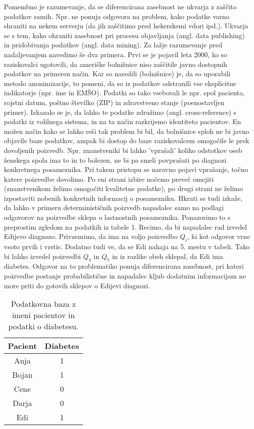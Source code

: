 \documentclass[12pt,a4paper]{amsart}
\theoremstyle{definition} %
\theoremstyle{plain} %
\begin{document}
Pomembno je razumevanje, da se diferencirana zasebnost ne ukvarja z zaščito podatkov samih. Npr. ne ponuja odgovora na problem, kako podatke varno shraniti na nekem serverju (da jih zaščitimo pred hekerskemi vdori ipd.). Ukvarja se s tem, kako ohraniti zasebnost pri procesu objavljanja (angl. data publishing) in pridobivanja podatkov (angl. data mining). Za lažje razumevanje pred nadaljevanjem navedimo še dva primera. Prvi se je pojavil leta 2000, ko so raziskovalci ugotovili, da ameriške bolnišnice niso zaščitile javno dostopnih podatkov na primeren način. Kar so naredili (bolnišnice) je, da so uporabili metodo anonimizacije, to pomeni, da so iz podatkov odstranili vse eksplicitne indikatorje (npr. ime in EMŠO). Podatki so tako vsebovali le npr. spol pacienta, rojstni datum, poštno številko (ZIP) in zdravstveno stanje (poenostavljen primer). Izkazalo se je, da lahko te podatke združimo (angl. cross-reference) s podatki iz volilnega sistema, in na ta način razkrijemo identiteto pacientov. En možen način kako se lahko reši tak problem bi bil, da bolnišnice sploh ne bi javno objavile baze podatkov, ampak bi dostop do baze raziskovalcem omogočile le prek dovoljenih poizvedb. Npr. znanstveniki bi lahko 'vprašali' koliko odstotkov oseb ženskega spola ima to in to bolezen, ne bi pa smeli povprašati po diagnozi konkretnega posameznika. Pri takem pristopu se naravno pojavi vprašanje, točno katere poizvedbe dovolimo. Po eni strani izbire nočemo preveč omejiti (znanstvenikom želimo omogočiti kvalitetne podatke), po drugi strani ne želimo izpostaviti nobenih konkretnih informacij o posamezniku. Hkrati se tudi izkaže, da lahko v primeru determinističnih poizvedb napadalec samo na podlagi odgovorov na poizvedbe sklepa o lastnostnih posameznika. Ponazorimo to s preprostim zgledom na podatkih iz tabele 1. Recimo, da bi napadalec rad izvedel Edijevo diagnozo. Privzemimo, da ima na voljo poizvedbo $Q_i$, ki kot odgovor vrne vsoto prvih i vrstic. Dodatno tudi ve, da se Edi nahaja na 5. mestu v tabeli. Tako bi lahko izvedel poizvedbi $Q_4$ in $Q_5$ in iz razlike obeh sklepal, da Edi ima diabetes.  Odgovor na to problematiko ponuja diferencirana zasebnost, pri kateri poizvedbe postanje probabilistične in napadalec kljub dodatnim informacijam ne more priti do gotovih sklepov o Edijevi diagnozi.
\begin{table}
\begin{center}
 \begin{tabular}{| c | c |} 
 \hline
 \textbf{Pacient} & \textbf{Diabetes}  \\ [0.5ex] 
 \hline
 Anja & 1  \\ 
 \hline
 Bojan & 1\\
 \hline
 Cene & 0 \\
 \hline
 Darja & 0  \\
 \hline
 Edi & 1  \\  
 \hline
\end{tabular}
\caption{Podatkovna baza z imeni pacientov in podatki o diabetesu.}
\end{center}
\end{table}
\end{document}
